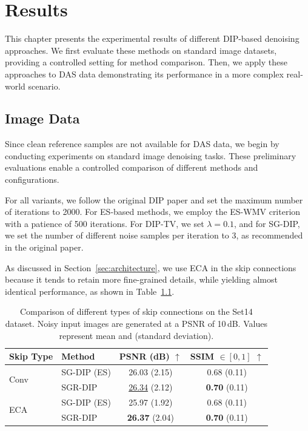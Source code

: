\chapter{Results}\label{ch:results}

This chapter presents the experimental results of different DIP-based denoising approaches.
We first evaluate these methods on standard image datasets, providing a controlled setting for method comparison.
Then, we apply these approaches to DAS data demonstrating its performance in a more complex real-world scenario.

\section{Image Data}

Since clean reference samples are not available for DAS data, we begin by conducting experiments on standard image denoising tasks.
These preliminary evaluations enable a controlled comparison of different methods and configurations.

For all variants, we follow the original DIP paper and set the maximum number of iterations to 2000.
For ES-based methods, we employ the ES-WMV criterion with a patience of 500 iterations.
For DIP-TV, we set $\lambda = 0.1$, and for SG-DIP, we set the number of different noise samples per iteration to 3, as recommended in the original paper.

As discussed in Section~\ref{sec:architecture}, we use ECA in the skip connections because it tends to retain more fine-grained details, while yielding almost identical performance, as shown in Table~\ref{tab:ECA}. 

\begin{table}
    \centering
    \begin{tabular}{ l l c c }
        \toprule
        Skip Type &Method &PSNR (dB) $\uparrow$ &SSIM $\in [0,1]$ $\uparrow$ \\
        \midrule
        \multirow{2}{4em}{Conv} &SG-DIP (ES) &26.03 {\scriptsize (2.15)} &0.68 {\scriptsize (0.11)} \\
        &SGR-DIP &\underline{26.34} {\scriptsize (2.12)} &\textbf{0.70} {\scriptsize (0.11)} \\
        \midrule
        \multirow{2}{4em}{ECA} &SG-DIP (ES) &25.97 {\scriptsize (1.92)} &0.68 {\scriptsize (0.11)} \\
        &SGR-DIP &\textbf{26.37} {\scriptsize (2.04)} &\textbf{0.70} {\scriptsize (0.11)} \\
        \bottomrule
    \end{tabular}
    \caption{
        Comparison of different types of skip connections on the Set14 dataset.
        Noisy input images are generated at a PSNR of 10\,dB.
        Values represent mean and {\scriptsize (standard deviation)}.
    }\label{tab:ECA}
\end{table}

